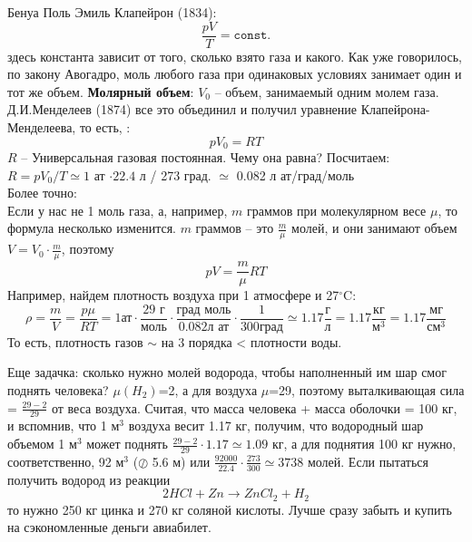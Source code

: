 \documentclass[12pt,epsfig,color,russian]{article}
\begin{document}
Бенуа Поль Эмиль Клапейрон (1834):
\begin{equation}
\frac{pV}T=\texttt{const.}
\end{equation}
здесь константа зависит от того, сколько взято газа и какого. Как уже говорилось, по закону Авогадро, моль любого газа при одинаковых усло\-ви\-ях занимает один и тот же объем. {\bf Молярный объем}: $V_0$ -- объем, занима\-е\-мый одним молем газа.\\
Д.И.Менделеев (1874) все это объединил и получил уравнение Клапейрона-Менделеева, то есть,  :\\
\begin{equation}
pV_0=RT
\end{equation}
$R$ -- Универсальная газовая постоянная. Чему она равна? Посчитаем:\\
 $R=pV_0/T\simeq 1$ ат $\cdot 22.4$ л / 273 град. $\simeq$ 0.082 л ат/град/моль\\

Более точно:
\\

Если у нас не 1 моль газа, а, например, $m$ граммов при молекулярном весе $\mu$, то формула несколько изменится. $m$ граммов -- это $\frac m\mu$ молей, и они занимают объем $V=V_0\cdot\frac m\mu$, поэтому
\begin{displaymath}
pV=\frac m\mu RT
\end{displaymath}
Например, найдем плотность воздуха при 1 атмосфере и 27$^\circ$C:
\begin{displaymath}
\rho=\frac mV =\frac {p\mu}{RT} = 1\texttt{ат}\cdot\frac{29\texttt{ г}}{\texttt{моль}}\cdot
       \frac{\texttt{град моль}}{0.082\texttt{л ат}}\cdot\frac1{300 \texttt{град}}
       \simeq1.17\frac{\texttt{г}}{\texttt{л}}=1.17\frac{\texttt{кг}}{\texttt{м}^3}
       =1.17\frac{\texttt{мг}}{\texttt{см}^3}
\end{displaymath}
То есть, плотность газов $\sim$ на 3 порядка < плотности воды.

Еще задачка: сколько нужно молей водорода, чтобы наполненный им шар смог поднять человека? $\mu(H_2)$=2, а для воздуха $\mu$=29, поэтому выталкивающая сила = $\frac{29-2}{29}$ от веса воздуха. Считая, что масса человека + масса оболочки = 100 кг, и вспомнив, что 1 м$^3$ воздуха весит 1.17 кг, получим, что водородный шар объемом 1 м$^3$ может поднять $\frac{29-2}{29}\cdot1.17\simeq1.09$ кг, а для поднятия 100 кг нужно, соответственно, 92 м$^3$ ($\oslash$ 5.6 м) или $\frac{92000}{22.4}\cdot\frac{273}{300}\simeq3738$ молей. Если пытаться получить водород из реакции
\begin{displaymath}
2HCl+Zn\rightarrow ZnCl_2+H_2
\end{displaymath}
то нужно 250 кг цинка и 270 кг соляной кислоты. Лучше сразу забыть и купить на сэкономленные деньги авиабилет.\\ \\
\end{document}
